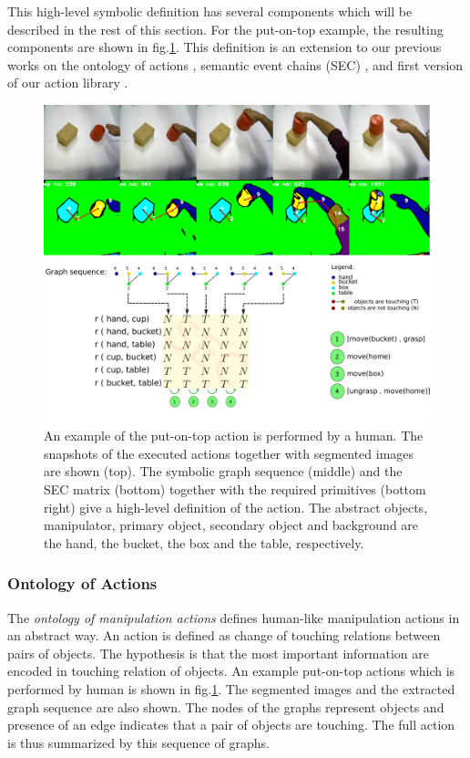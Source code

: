 This high-level symbolic definition has several components which will be described in the rest of this section.
For the put-on-top example, the resulting components are shown in fig.\ref{fig:action_graph_sec}.
This definition is an extension to our previous works on the ontology of actions \cite{TAMD13}, semantic event chains (SEC) \cite{Aksoy2011b},
and first version of our action library \cite{aein2013toward}.
\begin{figure}
      \centering
      \includegraphics[scale=0.20]{./pdf/action_graph_sec.pdf}
      \caption{ An example of the put-on-top action is performed by a human. 
The snapshots of the executed actions together with segmented images are shown (top).
The symbolic graph sequence (middle) and the SEC matrix (bottom) together with 
the required primitives (bottom right) give a high-level definition of the action.
The abstract objects, manipulator, primary object, secondary object and background are the hand, the bucket, the box and the table, respectively.}
      \label{fig:action_graph_sec}
\end{figure}


\subsubsection{Ontology of Actions}
\label{sec:ontology}

The \textit{ontology of manipulation actions} \cite{TAMD13} defines human-like manipulation actions in an abstract way.
An action is defined as change of touching relations between pairs of objects.
The hypothesis is that the most important information are encoded in touching relation of objects.
An example put-on-top actions which is performed by human is shown in fig.\ref{fig:action_graph_sec}.
The segmented images and the extracted graph sequence are also shown.
The nodes of the graphs represent objects and presence of an edge indicates that a pair of objects are touching.
The full action is thus summarized by this sequence of graphs.

